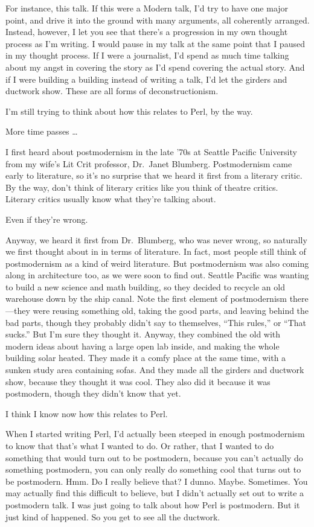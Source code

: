 \documentclass[10pt,letterpaper]{article}
\begin{document}
For instance, this talk. If this were a Modern talk, I'd try to have one
major point, and drive it into the ground with many arguments, all coherently
arranged. Instead, however, I let you see that there's a progression in my
own thought process as I'm writing. I would pause in my talk at the same
point that I paused in my thought process. If I were a journalist, I'd spend
as much time talking about my angst in covering the story as I'd spend
covering the actual story. And if I were building a building instead of
writing a talk, I'd let the girders and ductwork show. These are all forms of
deconstructionism.

I'm still trying to think about how this relates to Perl, by the way.

More time passes \ldots

I first heard about postmodernism in the late '70s at Seattle Pacific
University from my wife's Lit Crit professor, Dr.~Janet Blumberg.
Postmodernism came early to literature, so it's no surprise that we heard it
first from a literary critic. By the way, don't think of literary critics
like you think of theatre critics. Literary critics usually know what they're
talking about.

Even if they're wrong.

Anyway, we heard it first from Dr.~Blumberg, who was never wrong, so
naturally we first thought about in in terms of literature. In fact, most
people still think of postmodernism as a kind of weird literature. But
postmodernism was also coming along in architecture too, as we were soon to
find out. Seattle Pacific was wanting to build a new science and math
building, so they decided to recycle an old warehouse down by the ship canal.
Note the first element of postmodernism there---they were reusing something
old, taking the good parts, and leaving behind the bad parts, though they
probably didn't say to themselves, ``This rules,'' or ``That sucks.'' But
I'm sure they thought it. Anyway, they combined the old with modern ideas
about having a large open lab inside, and making the whole building solar
heated. They made it a comfy place at the same time, with a sunken study area
containing sofas. And they made all the girders and ductwork show, because
they thought it was cool. They also did it because it was postmodern, though
they didn't know that yet.

I think I know now how this relates to Perl.

When I started writing Perl, I'd actually been steeped in enough
postmodernism to know that that's what I wanted to do. Or rather, that I
wanted to do something that would turn out to be postmodern, because you
can't actually do something postmodern, you can only really do something cool
that turns out to be postmodern. Hmm. Do I really believe that? I dunno.
Maybe. Sometimes. You may actually find this difficult to believe, but I
didn't actually set out to write a postmodern talk. I was just going to talk
about how Perl is postmodern. But it just kind of happened. So you get to see
all the ductwork.
\end{document}
